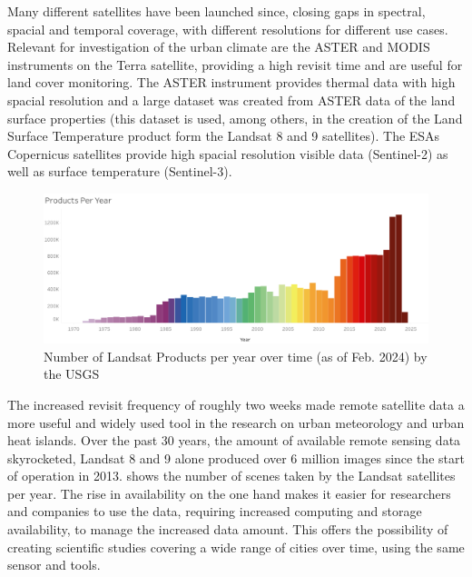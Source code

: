 \documentclass[12pt,a4paper, english,twoside]{scrartcl}
\begin{document}
  Many different satellites have been launched since, closing gaps in spectral, spacial and temporal coverage, with different resolutions for different use cases. 
  Relevant for investigation of the urban climate are the ASTER and MODIS instruments on the Terra satellite, providing a high revisit time and are useful for land cover monitoring. 
  The ASTER instrument provides thermal data with high spacial resolution and a large dataset was created from ASTER data of the land surface properties (this dataset is used, among others, in the creation of the Land Surface Temperature product form the Landsat 8 and 9 satellites).
  The \glspl{ESA} Copernicus satellites provide high spacial resolution visible data (Sentinel-2) as well as surface temperature (Sentinel-3).\\
  \begin{figure}[!htbp]
    \centering
    \includegraphics[width=\textwidth]{img/LandsatDataArchiveStatsProductsPerYear.png}
    \caption{Number of Landsat Products per year over time (as of Feb. 2024) by the \gls{USGS}~\autocite{landsatstats}\label{fig:landsatproductsovertime}}
  \end{figure}
  \noindent
  The increased revisit frequency of roughly two weeks made remote satellite data a more useful and widely used tool in the research on urban meteorology and urban heat islands.
  Over the past 30 years, the amount of available remote sensing data skyrocketed, Landsat 8 and 9 alone produced over 6 million images since the start of operation in 2013.  shows the number of scenes taken by the Landsat satellites per year.
  The rise in availability on the one hand makes it easier for researchers and companies to use the data, requiring increased computing and storage availability, to manage the increased data amount.
  This offers the possibility of creating scientific studies covering a wide range of cities over time, using the same sensor and tools. \\ \\
\end{document}
